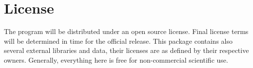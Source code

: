 \documentclass[a4paper,12pt]{article}
\begin{document}
\section{License}

The program will be distributed under an open source license. Final license terms will be determined in time for the official release. This package contains also several external libraries and data, their licenses are as defined by their respective owners. Generally, everything here is free for non-commercial scientific use.


\setlength{\bibsep}{0.1cm}
\small

\end{document}
